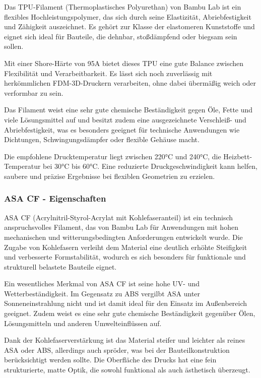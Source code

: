 \documentclass[a4paper,12pt]{article}
\begin{document}
Das TPU-Filament (Thermoplastisches Polyurethan) von Bambu Lab ist ein flexibles Hochleistungspolymer, das sich durch seine Elastizität, Abriebfestigkeit und Zähigkeit auszeichnet. Es gehört zur Klasse der elastomeren Kunststoffe und eignet sich ideal für Bauteile, die dehnbar, stoßdämpfend oder biegsam sein sollen.

Mit einer Shore-Härte von 95A bietet dieses TPU eine gute Balance zwischen Flexibilität und Verarbeitbarkeit. Es lässt sich noch zuverlässig mit herkömmlichen FDM-3D-Druckern verarbeiten, ohne dabei übermäßig weich oder verformbar zu sein.

Das Filament weist eine sehr gute chemische Beständigkeit gegen Öle, Fette und viele Lösungsmittel auf und besitzt zudem eine ausgezeichnete Verschleiß- und Abriebfestigkeit, was es besonders geeignet für technische Anwendungen wie Dichtungen, Schwingungsdämpfer oder flexible Gehäuse macht.

Die empfohlene Drucktemperatur liegt zwischen 220°C und 240°C, die Heizbett-Temperatur bei 30°C bis 60°C. Eine reduzierte Druckgeschwindigkeit kann helfen, saubere und präzise Ergebnisse bei flexiblen Geometrien zu erzielen.\cite{Bambu_Lab_Filament_TPU}\newline

\subsubsection{ASA CF - Eigenschaften}

ASA CF (Acrylnitril-Styrol-Acrylat mit Kohlefaseranteil) ist ein technisch anspruchsvolles Filament, das von Bambu Lab für Anwendungen mit hohen mechanischen und witterungsbedingten Anforderungen entwickelt wurde. Die Zugabe von Kohlefasern verleiht dem Material eine deutlich erhöhte Steifigkeit und verbesserte Formstabilität, wodurch es sich besonders für funktionale und strukturell belastete Bauteile eignet.

Ein wesentliches Merkmal von ASA CF ist seine hohe UV- und Wetterbeständigkeit. Im Gegensatz zu ABS vergilbt ASA unter Sonneneinstrahlung nicht und ist damit ideal für den Einsatz im Außenbereich geeignet. Zudem weist es eine sehr gute chemische Beständigkeit gegenüber Ölen, Lösungsmitteln und anderen Umwelteinflüssen auf.

Dank der Kohlefaserverstärkung ist das Material steifer und leichter als reines ASA oder ABS, allerdings auch spröder, was bei der Bauteilkonstruktion berücksichtigt werden sollte. Die Oberfläche des Drucks hat eine fein strukturierte, matte Optik, die sowohl funktional als auch ästhetisch überzeugt.
\end{document}
